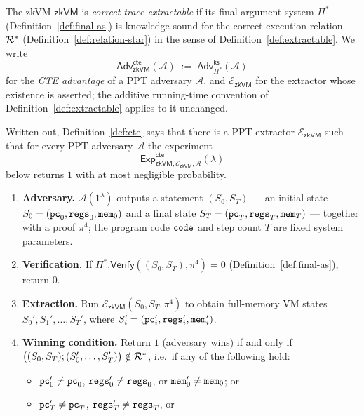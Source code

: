 \begin{definition}\label{def:cte}
The zkVM $\mathsf{zkVM}$ is \emph{correct-trace extractable} if its final
argument system $\Pi^*$ (Definition~\ref{def:final-as}) is knowledge-sound for
the correct-execution relation $\mathcal{R}^*$ (Definition~\ref{def:relation-star})
in the sense of Definition~\ref{def:extractable}.  We write
\[
  \mathsf{Adv}^{\mathsf{cte}}_{\mathsf{zkVM}}(\mathcal{A})
  \;:=\;\mathsf{Adv}^{\mathsf{ks}}_{\Pi^*}(\mathcal{A})
\]
for the \emph{CTE advantage} of a PPT adversary $\mathcal{A}$, and
$\mathcal{E}_{\mathsf{zkVM}}$ for the extractor whose existence is asserted; the
additive running-time convention of Definition~\ref{def:extractable} applies to
it unchanged.
\end{definition}

\begin{remark}\label{rem:cte-experiment}
Written out, Definition~\ref{def:cte} says that there is a PPT extractor
$\mathcal{E}_{\mathsf{zkVM}}$ such that for every PPT adversary $\mathcal{A}$ the
experiment
\[
  \mathsf{Exp}_{\mathsf{zkVM},\mathcal{E}_{\mathsf{zkVM}},\mathcal{A}}^{\mathsf{cte}}(\lambda)
\]
below returns $1$ with at most negligible probability.
\begin{enumerate}
  \item \textbf{Adversary.} $\mathcal{A}(1^\lambda)$ outputs a statement
    $(S_0,S_T)$ --- an initial state $S_0=(\mathtt{pc}_0,\mathtt{regs}_0,\mathtt{mem}_0)$ and a final
    state $S_T=(\mathtt{pc}_T,\mathtt{regs}_T,\mathtt{mem}_T)$ --- together with a proof $\pi^4$; the
    program code $\mathtt{code}$ and step count $T$ are fixed system parameters.
  \item \textbf{Verification.} If $\Pi^*.\mathsf{Verify}((S_0,S_T),\pi^4)=0$
    (Definition~\ref{def:final-as}), return $0$.
  \item \textbf{Extraction.} Run $\mathcal{E}_{\mathsf{zkVM}}(S_0,S_T,\pi^4)$ to
    obtain full-memory VM states $S_0',S_1',\ldots,S_T'$, where
    $S_i'=(\mathtt{pc}_i',\mathtt{regs}_i',\mathtt{mem}_i')$.
  \item \textbf{Winning condition.} Return $1$ (adversary wins) if and only if
    $\bigl((S_0,S_T);(S_0',\ldots,S_T')\bigr)\notin\mathcal{R}^*$, i.e.\ if any of
    the following hold:
    \begin{itemize}
      \item $\mathtt{pc}_0' \neq \mathtt{pc}_0$, $\mathtt{regs}_0' \neq \mathtt{regs}_0$, or
        $\mathtt{mem}_0' \neq \mathtt{mem}_0$; or
      \item $\mathtt{pc}_T' \neq \mathtt{pc}_T$, $\mathtt{regs}_T' \neq \mathtt{regs}_T$, or

\end{itemize}
\end{enumerate}
\end{remark}
